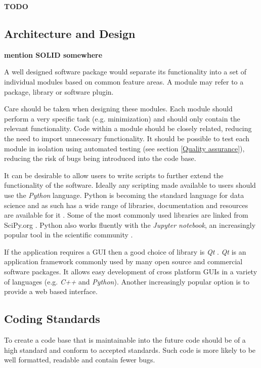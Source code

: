 \documentclass[jnr]{iosart2x}
\newcommand{\todo}[1]{\textbf{#1}}
\begin{document}
\todo{TODO}

\subsection{Architecture and Design}
\label{Architecture}

\todo{mention SOLID somewhere}

A well designed software package would separate its functionality into a set of individual modules based on common feature areas.
A module may refer to a package, library or software plugin.

Care should be taken when designing these modules.
Each module should perform a very specific task (e.g. minimization) and should only contain the relevant functionality.
Code within a module should be closely related, reducing the need to import unnecessary functionality.
It should be possible to test each module in isolation using automated testing (see section \ref{Quality assurance}), reducing the risk of bugs being introduced into the code base.

It can be desirable to allow users to write scripts to further extend the functionality of the software.
Ideally any scripting made available to users should use the {\it Python} language.
Python is becoming the standard language for data science and as such has a wide range of libraries, documentation and resources are available for it \cite{python-nature}.
Some of the most commonly used libraries are linked from SciPy.org \cite{scipy}.
Python also works fluently with the {\it Jupyter notebook}, an increasingly popular tool in the scientific community \cite{jupyter-nature}.

If the application requires a GUI then a good choice of library is {\it Qt} \cite{Qt}.
{\it Qt} is an application framework commonly used by many open source and commercial software packages.
It allows easy development of cross platform GUIs in a variety of languages (e.g. {\it C++} and {\it Python}).
Another increasingly popular option is to provide a web based interface.

\subsection{Coding Standards}
\label{Coding standards}

To create a code base that is maintainable into the future code should be of a high standard and conform to accepted standards.
Such code is more likely to be well formatted, readable and contain fewer bugs.
\end{document}
